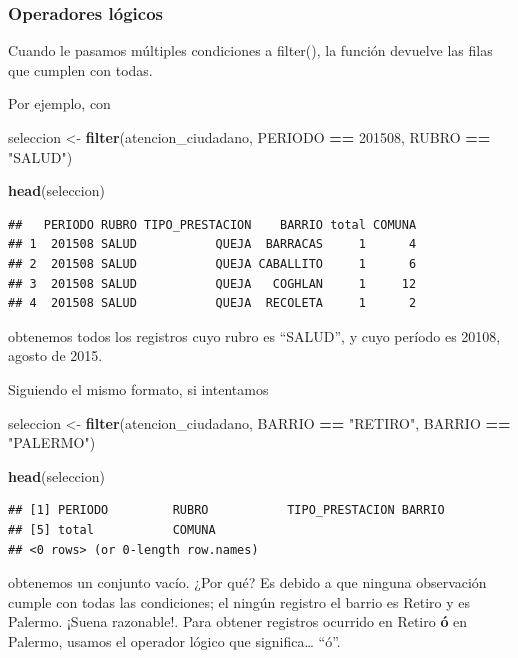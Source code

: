 \documentclass[]{book}
\newenvironment{Shaded}{\begin{snugshade}}{\end{snugshade}}
\newcommand{\KeywordTok}[1]{\textcolor[rgb]{0.13,0.29,0.53}{\textbf{#1}}}
\newcommand{\DecValTok}[1]{\textcolor[rgb]{0.00,0.00,0.81}{#1}}
\newcommand{\StringTok}[1]{\textcolor[rgb]{0.31,0.60,0.02}{#1}}
\newcommand{\OperatorTok}[1]{\textcolor[rgb]{0.81,0.36,0.00}{\textbf{#1}}}
\newcommand{\NormalTok}[1]{#1}
\begin{document}
\subsubsection{Operadores lógicos}\label{operadores-logicos}

Cuando le pasamos múltiples condiciones a filter(), la función devuelve
las filas que cumplen con todas.

Por ejemplo, con

\begin{Shaded}
\begin{Highlighting}[]
\NormalTok{seleccion <-}\StringTok{ }\KeywordTok{filter}\NormalTok{(atencion_ciudadano, PERIODO }\OperatorTok{==}\StringTok{ }\DecValTok{201508}\NormalTok{,  RUBRO }\OperatorTok{==}\StringTok{ "SALUD"}\NormalTok{)}

\KeywordTok{head}\NormalTok{(seleccion)}
\end{Highlighting}
\end{Shaded}

\begin{verbatim}
##   PERIODO RUBRO TIPO_PRESTACION    BARRIO total COMUNA
## 1  201508 SALUD           QUEJA  BARRACAS     1      4
## 2  201508 SALUD           QUEJA CABALLITO     1      6
## 3  201508 SALUD           QUEJA   COGHLAN     1     12
## 4  201508 SALUD           QUEJA  RECOLETA     1      2
\end{verbatim}

obtenemos todos los registros cuyo rubro es ``SALUD'', y cuyo período es
20108, agosto de 2015.

Siguiendo el mismo formato, si intentamos

\begin{Shaded}
\begin{Highlighting}[]
\NormalTok{seleccion <-}\StringTok{ }\KeywordTok{filter}\NormalTok{(atencion_ciudadano, BARRIO }\OperatorTok{==}\StringTok{ "RETIRO"}\NormalTok{, BARRIO }\OperatorTok{==}\StringTok{ "PALERMO"}\NormalTok{)}

\KeywordTok{head}\NormalTok{(seleccion)}
\end{Highlighting}
\end{Shaded}

\begin{verbatim}
## [1] PERIODO         RUBRO           TIPO_PRESTACION BARRIO         
## [5] total           COMUNA         
## <0 rows> (or 0-length row.names)
\end{verbatim}

obtenemos un conjunto vacío. ¿Por qué? Es debido a que ninguna
observación cumple con todas las condiciones; el ningún registro el
barrio es Retiro y es Palermo. ¡Suena razonable!. Para obtener registros
ocurrido en Retiro \textbf{ó} en Palermo, usamos el operador lógico
\texttt{\textbar{}} que significa\ldots{} ``ó''.
\end{document}
